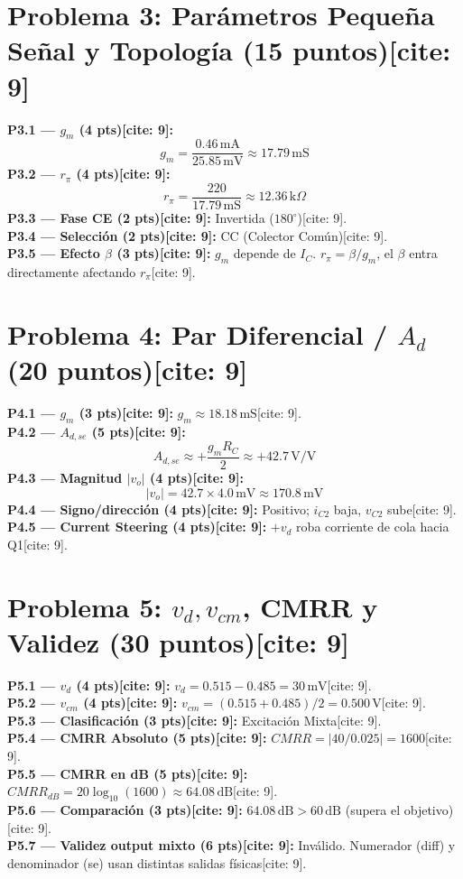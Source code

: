 \documentclass[11pt, a4paper]{article}
\begin{document}
\section*{Problema 3: Parámetros Pequeña Señal y Topología (15 puntos)[cite: 9]}
\textbf{P3.1 — $g_m$ (4 pts)[cite: 9]:} $$ g_m = \frac{0.46\,\text{mA}}{25.85\,\text{mV}} \approx 17.79\,\text{mS} $$
\textbf{P3.2 — $r_\pi$ (4 pts)[cite: 9]:} $$ r_\pi = \frac{220}{17.79\,\text{mS}} \approx 12.36\,\text{k}\Omega $$
\textbf{P3.3 — Fase CE (2 pts)[cite: 9]:} Invertida ($180^\circ$)[cite: 9]. \\
\textbf{P3.4 — Selección (2 pts)[cite: 9]:} CC (Colector Común)[cite: 9]. \\
\textbf{P3.5 — Efecto $\beta$ (3 pts)[cite: 9]:} $g_m$ depende de $I_C$. $r_\pi = \beta/g_m$, el $\beta$ entra directamente afectando $r_\pi$[cite: 9].

\section*{Problema 4: Par Diferencial / $A_d$ (20 puntos)[cite: 9]}
\textbf{P4.1 — $g_m$ (3 pts)[cite: 9]:} $g_m \approx 18.18\,\text{mS}$[cite: 9]. \\
\textbf{P4.2 — $A_{d,se}$ (5 pts)[cite: 9]:} $$ A_{d,se} \approx +\frac{g_m R_C}{2} \approx +42.7\,\text{V/V} $$
\textbf{P4.3 — Magnitud $|v_o|$ (4 pts)[cite: 9]:} $$ |v_o| = 42.7 \times 4.0\,\text{mV} \approx 170.8\,\text{mV} $$
\textbf{P4.4 — Signo/dirección (4 pts)[cite: 9]:} Positivo; $i_{C2}$ baja, $v_{C2}$ sube[cite: 9]. \\
\textbf{P4.5 — Current Steering (4 pts)[cite: 9]:} $+v_d$ roba corriente de cola hacia Q1[cite: 9].

\section*{Problema 5: $v_d, v_{cm}$, CMRR y Validez (30 puntos)[cite: 9]}
\textbf{P5.1 — $v_d$ (4 pts)[cite: 9]:} $v_d = 0.515 - 0.485 = 30\,\text{mV}$[cite: 9]. \\
\textbf{P5.2 — $v_{cm}$ (4 pts)[cite: 9]:} $v_{cm} = (0.515 + 0.485)/2 = 0.500\,\text{V}$[cite: 9]. \\
\textbf{P5.3 — Clasificación (3 pts)[cite: 9]:} Excitación Mixta[cite: 9]. \\
\textbf{P5.4 — CMRR Absoluto (5 pts)[cite: 9]:} $CMRR = |40 / 0.025| = 1600$[cite: 9]. \\
\textbf{P5.5 — CMRR en dB (5 pts)[cite: 9]:} $CMRR_{dB} = 20\log_{10}(1600) \approx 64.08\,\text{dB}$[cite: 9]. \\
\textbf{P5.6 — Comparación (3 pts)[cite: 9]:} $64.08\,\text{dB} > 60\,\text{dB}$ (supera el objetivo)[cite: 9]. \\
\textbf{P5.7 — Validez output mixto (6 pts)[cite: 9]:} Inválido. Numerador (diff) y denominador (se) usan distintas salidas físicas[cite: 9].
\end{document}
